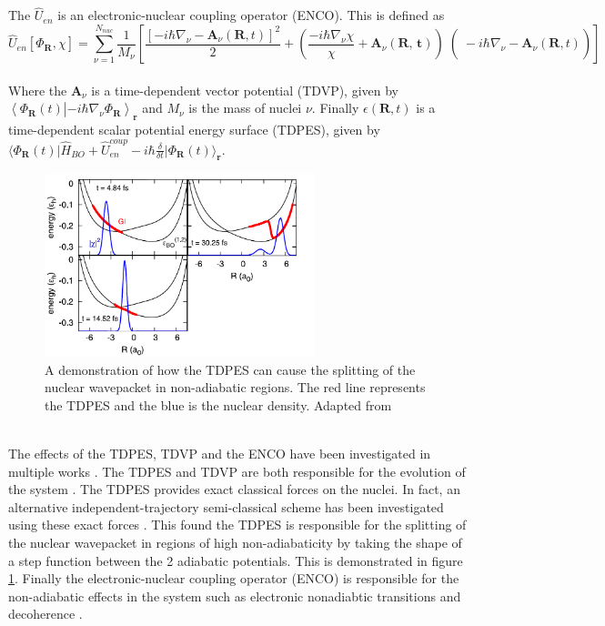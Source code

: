 \\\\
The $\hat{U}_{en}$ is an electronic-nuclear coupling operator (ENCO). This is defined as \begin{equation}
  \hat{U}_{en}[\Phi_{\textbf{R}}, \chi] = \sum_{\nu=1}^{N_{nuc}} \frac{1}{M_{\nu}} \left[ \frac{\left[-i \hbar \nabla_{\nu} - \textbf{A}_{\nu}(\textbf{R}, t) \right]^2}{2} + \left( \left. \left. \frac{-i\hbar \nabla_{\nu} \chi}{\chi} + \textbf{A}_{\nu}(\textbf{R, t})\right)\right( -i\hbar\nabla_{\nu} - \textbf{A}_{\nu}(\textbf{R}, t)\right) \right]
  \label{eq:ENCO}
\end{equation}
\\
Where the $\textbf{A}_{\nu}$ is a time-dependent vector potential (TDVP), given by $\left\langle \Phi_{\textbf{R}}(t) \right\vert \left. - i \hbar \nabla_{\nu} \Phi_{\textbf{R}} \right\rangle_{\textbf{r}}$ and $M_{\nu}$ is the mass of nuclei $\nu$.
Finally $\epsilon(\textbf{R}, t)$ is a time-dependent scalar potential energy surface (TDPES), given by $\langle \Phi_{\textbf{R}}(t) \vert \hat{H}_{BO} + \hat{U}_{en}^{coup} - i\hbar \frac{\delta}{\delta t} \vert \Phi_{\textbf{R}}(t) \rangle_{\textbf{r}}$.
\begin{figure}
  \includegraphics[width=0.7\textwidth]{./img/nuclear_splitting_TDPES.png}
  \caption{A demonstration of how the TDPES can cause the splitting of the nuclear wavepacket in non-adiabatic regions. The red line represents the TDPES and the blue is the nuclear density. Adapted from \cite{agostini_exact_2015} \label{fig:step_TDPES}}
\end{figure}
\\
The effects of the TDPES, TDVP and the ENCO have been investigated in multiple works \cite{agostini_semiclassical_2015, agostini_exact_2015, agostini_mixed_2013, abedi_dynamical_2013, Min2014Dec}. The TDPES and TDVP are both responsible for the evolution of the system
\cite{agostini_semiclassical_2015}.  The TDPES provides exact classical forces on the nuclei. In fact, an alternative independent-trajectory semi-classical scheme has been investigated using these exact forces \cite{agostini_exact_2015}. This found the TDPES is responsible for the splitting of the nuclear wavepacket in regions of high non-adiabaticity by taking the shape of a step function between the 2 adiabatic potentials. This is demonstrated in figure \ref{fig:step_TDPES}. Finally the electronic-nuclear coupling operator (ENCO) is responsible for the non-adiabatic effects in the system such as electronic nonadiabtic transitions and decoherence \cite{agostini_semiclassical_2015}.
